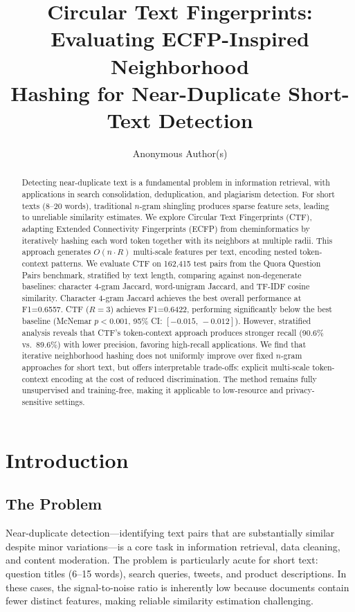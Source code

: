 \documentclass[11pt,letterpaper]{article}
\title{\textbf{Circular Text Fingerprints: Evaluating ECFP-Inspired Neighborhood\\Hashing for Near-Duplicate Short-Text Detection}}
\author{
  Anonymous Author(s)
}
\date{}
\begin{document}
\maketitle

\begin{abstract}
Detecting near-duplicate text is a fundamental problem in information retrieval, with applications in search consolidation, deduplication, and plagiarism detection. For short texts (8--20 words), traditional $n$-gram shingling produces sparse feature sets, leading to unreliable similarity estimates. We explore Circular Text Fingerprints (CTF), adapting Extended Connectivity Fingerprints (ECFP) from cheminformatics by iteratively hashing each word token together with its neighbors at multiple radii. This approach generates $O(n \cdot R)$ multi-scale features per text, encoding nested token-context patterns. We evaluate CTF on 162,415 test pairs from the Quora Question Pairs benchmark, stratified by text length, comparing against non-degenerate baselines: character 4-gram Jaccard, word-unigram Jaccard, and TF-IDF cosine similarity. Character 4-gram Jaccard achieves the best overall performance at F1=0.6557. CTF ($R=3$) achieves F1=0.6422, performing significantly below the best baseline (McNemar $p{<}0.001$, 95\% CI: $[-0.015,\,-0.012]$). However, stratified analysis reveals that CTF's token-context approach produces stronger recall (90.6\% vs.\ 89.6\%) with lower precision, favoring high-recall applications. We find that iterative neighborhood hashing does not uniformly improve over fixed $n$-gram approaches for short text, but offers interpretable trade-offs: explicit multi-scale token-context encoding at the cost of reduced discrimination. The method remains fully unsupervised and training-free, making it applicable to low-resource and privacy-sensitive settings.
\end{abstract}

\section{Introduction}

\subsection{The Problem}

Near-duplicate detection---identifying text pairs that are substantially similar despite minor variations---is a core task in information retrieval, data cleaning, and content moderation. The problem is particularly acute for short text: question titles (6--15 words), search queries, tweets, and product descriptions. In these cases, the signal-to-noise ratio is inherently low because documents contain fewer distinct features, making reliable similarity estimation challenging.
\end{document}
